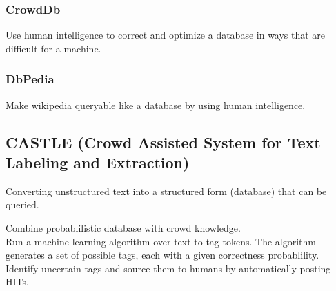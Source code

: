 \documentclass[12pt]{article}
\begin{document}
\subsubsection{CrowdDb}
Use human intelligence to correct and optimize a database in ways that are
difficult for a machine.

\subsubsection{DbPedia}
Make wikipedia queryable like a database by using human intelligence.

\subsection{CASTLE (Crowd Assisted System for Text Labeling and Extraction)}
Converting unstructured text into a structured form (database) that can be
queried.

Combine probablilistic database with crowd knowledge.\\
Run a machine learning algorithm over text to tag tokens. The algorithm
generates a set of possible tags, each with a given correctness probablility.
Identify uncertain tags and source them to humans by automatically posting HITs.
\end{document}
